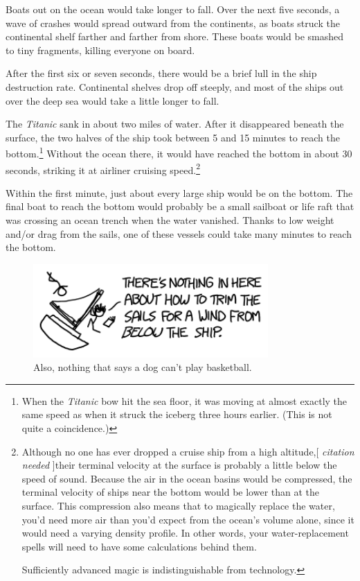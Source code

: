 {{Boats out on the ocean would take longer to fall. Over the next five seconds, a wave of crashes would spread outward from the continents, as boats struck the continental shelf farther and farther from shore. These boats would be smashed to tiny fragments, killing everyone on board.}

{After the first six or seven seconds, there would be a brief lull in the ship destruction rate. Continental shelves drop off steeply, and most of the ships out over the deep sea would take a little longer to fall.}

{The \emph{Titanic} sank in about two miles of water. After it disappeared beneath the surface, the two halves of the ship took between 5 and 15 minutes to reach the bottom.{\footnote{When the \emph{Titanic} bow hit the sea floor, it was moving at almost exactly the same speed as when it struck the iceberg three hours earlier. (This is not quite a coincidence.)} } Without the ocean there, it would have reached the bottom in about 30 seconds, striking it at airliner cruising speed.{\footnote{Although no one has ever dropped a cruise ship from a high altitude,[ \emph{citation needed} ]their terminal velocity at the surface is probably a little below the speed of sound. Because the air in the ocean basins would be compressed, the terminal velocity of ships near the bottom would be lower than at the surface. This compression also means that to magically replace the water, you'd need more air than you'd expect from the ocean's volume alone, since it would need a varying density profile. In other words, your water-replacement spells will need to have some calculations behind them.

Sufficiently advanced magic is indistinguishable from technology.} } }

{Within the first minute, just about every large ship would be on the bottom. The final boat to reach the bottom would probably be a small sailboat or life raft that was crossing an ocean trench when the water vanished. Thanks to low weight and/or drag from the sails, one of these vessels could take many minutes to reach the bottom.}

\begin{figure}[!htbp]
\centering
\includegraphics[scale=0.5, max width=0.8\textwidth]{imgs/a/103/sailboat.png}
\caption{Also, nothing that says a dog can't play basketball.}
\end{figure}

}
